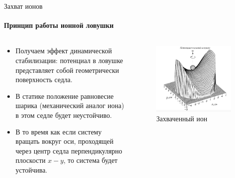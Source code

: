 \documentclass{beamer}
\begin{document}
    \begin{frame}{Захват ионов}
    \framesubtitle{Принцип работы ионной ловушки}

        \begin{columns}

        \begin{column}{0.5\textwidth}

            \begin{itemize}
                \item Получаем эффект динамической стабилизации: потенциал в ловушке представляет собой геометрически поверхность седла.
                \item В статике положение равновесие шарика (механический аналог иона) в этом седле будет неустойчиво.
                \item В то время как если систему вращать вокруг оси, проходящей через центр седла перпендикулярно плоскости $x - y$, то система
                будет устойчива.
            \end{itemize}

        \end{column}

        \begin{column}{0.5\textwidth}
            \begin{figure}
                \centering
                \includegraphics[width=\textwidth]{media/trap-potential.png}
                \caption{Захваченный ион}
            \end{figure}
        \end{column}

        \end{columns}

        \end{frame}
\end{document}

